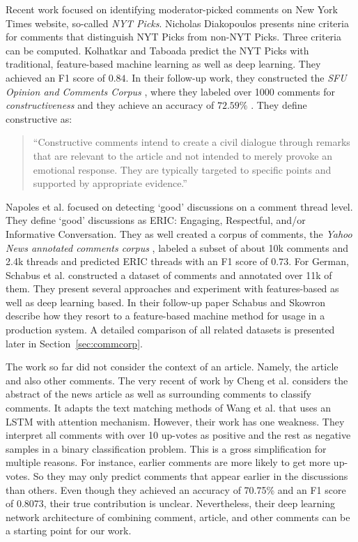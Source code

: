 Recent work focused on identifying moderator-picked comments on New York Times website, so-called \textit{NYT Picks}. Nicholas Diakopoulos \cite{diakopoulos2015picking} presents nine criteria for comments that distinguish NYT Picks from non-NYT Picks. Three criteria can be computed. Kolhatkar and Taboada \cite{kolhatkar_using_2017} predict the NYT Picks with traditional, feature-based machine learning as well as deep learning. They achieved an F1 score of $0.84$. In their follow-up work, they constructed the \textit{SFU Opinion and Comments Corpus} \cite{kolhatkar2018sfu}, where they labeled over 1000 comments for \textit{constructiveness} and they achieve an accuracy of $72.59\%$ \cite{kolhatkar2017constructive}. They define constructive as: 
\begin{quote}
     ``Constructive comments intend to create a civil dialogue through remarks that are relevant to the article and not intended to merely provoke an emotional response. They are typically targeted to specific points and supported by appropriate evidence.''
\end{quote}
Napoles et al. \cite{napoles2017automatically} focused on detecting `good' discussions on a comment thread level. They define `good' discussions as ERIC: Engaging, Respectful, and/or Informative Conversation. They as well created a corpus of comments, the \textit{Yahoo News annotated comments corpus} \cite{napoles2017finding}, labeled a subset of about 10k comments and  2.4k threads and predicted ERIC threads with an F1 score of $0.73$. For German,  Schabus et al. \cite{Schabus:2017:OMP:3077136.3080711} constructed a dataset of comments and annotated over 11k of them. They present several approaches and experiment with features-based as well as deep learning based. In their follow-up paper Schabus and Skowron \cite{schabus_academic-industrial_nodate} describe how they resort to a feature-based machine method for usage in a production system. A detailed comparison of all related datasets is presented later in Section~\ref{sec:commcorp}.

The work so far did not consider the context of an article. Namely, the article and also other comments. The very recent of work by Cheng et al. \cite{2018arXiv180807191C} considers the abstract of the news article as well as surrounding comments to classify comments. It adapts the text matching methods of Wang et al. \cite{wang_bilateral_2017} that uses an LSTM \cite{hochreiter1997long} with attention mechanism. However, their work has one weakness. They interpret all comments with over 10 up-votes as positive and the rest as negative samples in a binary classification problem. This is a gross simplification for multiple reasons. For instance, earlier comments are more likely to get more up-votes. So they may only predict comments that appear earlier in the discussions than others. Even though they achieved an accuracy of 70.75\% and an F1 score of 0.8073, their true contribution is unclear. Nevertheless, their deep learning network architecture of combining comment, article, and other comments can be a starting point for our work.

